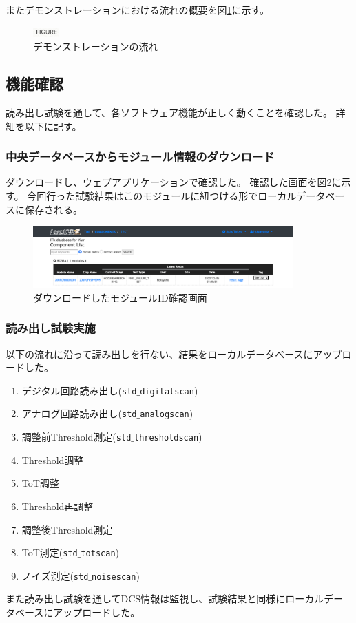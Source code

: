 またデモンストレーションにおける流れの概要を図\ref{demo_flow}に示す。

\begin{figure}[bpt]\centering
\includegraphics[width=1cm]{figure}
\caption[デモンストレーションの流れ]{デモンストレーションの流れ}
\label{demo_flow}
\end{figure}


\subsection{機能確認}
読み出し試験を通して、各ソフトウェア機能が正しく動くことを確認した。
詳細を以下に記す。

\subsubsection{中央データベースからモジュール情報のダウンロード}
ダウンロードし、ウェブアプリケーションで確認した。
確認した画面を図\ref{demo_download_SCC}に示す。
今回行った試験結果はこのモジュールに紐つける形でローカルデータベースに保存される。

\begin{figure}[bpt]\centering
\includegraphics[width=10cm]{demo_download_SCC}
\caption[ダウンロードしたモジュールID確認画面]{ダウンロードしたモジュールID確認画面}
\label{demo_download_SCC}
\end{figure}


\subsubsection{読み出し試験実施}
以下の流れに沿って読み出しを行ない、結果をローカルデータベースにアップロードした。
\begin{enumerate}
  \item デジタル回路読み出し(\texttt{std$\_$digitalscan})
  \item アナログ回路読み出し(\texttt{std$\_$analogscan})
  \item 調整前Threshold測定(\texttt{std$\_$thresholdscan})
  \item Threshold調整
  \item ToT調整
  \item Threshold再調整
  \item 調整後Threshold測定
  \item ToT測定(\texttt{std$\_$totscan})
  \item ノイズ測定(\texttt{std$\_$noisescan})
\end{enumerate}
また読み出し試験を通してDCS情報は監視し、試験結果と同様にローカルデータベースにアップロードした。

